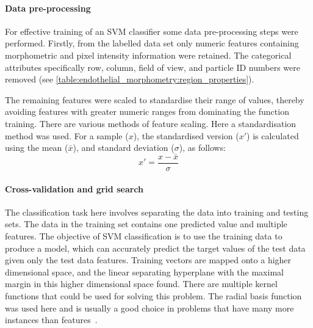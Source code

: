\paragraph{Data pre-processing}
For effective training of an SVM classifier some data pre-processing steps were performed. Firstly, from the labelled data set only numeric features containing morphometric and pixel intensity information were retained. The categorical attributes specifically row, column, field of view, and particle ID numbers were removed (see \autoref{table:endothelial_morphometry:region_properties}).

The remaining features were scaled to standardise their range of values, thereby avoiding features with greater numeric ranges from dominating the function training. There are various methods of feature scaling. Here a standardisation method was used. For a sample ($x$), the standardised version ($x'$) is calculated using the mean ($\bar{x}$), and standard deviation ($\sigma$), as follows:
\begin{equation}
x'=\frac{x-\bar{x}}{\sigma}
\end{equation}

\paragraph{Cross-validation and grid search}
The classification task here involves separating the data into training and testing sets. The data in the training set contains one predicted value and multiple features. The objective of SVM classification is to use the training data to produce a model, which can accurately predict the target values of the test data given only the test data features. Training vectors are mapped onto a higher dimensional space, and the linear separating hyperplane with the maximal margin in this higher dimensional space found. There are multiple kernel functions that could be used for solving this problem. The radial basis function was used here and is usually a good choice in problems that have many more instances than features~\cite{Hsu2008}.


